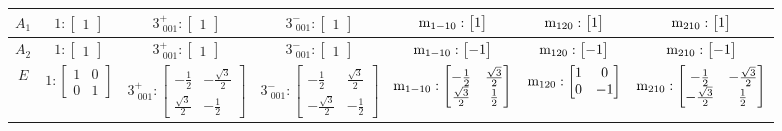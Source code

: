 \documentclass[fleqn,8pt,landscape]{jsarticle}
\begin{document}
\begin{longtable}{ccccccc}
$ A_{1} $ & $ 1:\begin{bmatrix} 1 \end{bmatrix} $ & $ 3^{+}_{\,\,001}:\begin{bmatrix} 1 \end{bmatrix} $ & $ 3^{-}_{\,\,001}:\begin{bmatrix} 1 \end{bmatrix} $ & $ {\rm m}_{1-10}:\begin{bmatrix} 1 \end{bmatrix} $ & $ {\rm m}_{120}:\begin{bmatrix} 1 \end{bmatrix} $ & $ {\rm m}_{210}:\begin{bmatrix} 1 \end{bmatrix} $ \\ \hline
$ A_{2} $ & $ 1:\begin{bmatrix} 1 \end{bmatrix} $ & $ 3^{+}_{\,\,001}:\begin{bmatrix} 1 \end{bmatrix} $ & $ 3^{-}_{\,\,001}:\begin{bmatrix} 1 \end{bmatrix} $ & $ {\rm m}_{1-10}:\begin{bmatrix} -1 \end{bmatrix} $ & $ {\rm m}_{120}:\begin{bmatrix} -1 \end{bmatrix} $ & $ {\rm m}_{210}:\begin{bmatrix} -1 \end{bmatrix} $ \\ \hline
$ E $ & $ 1:\begin{bmatrix} 1 & 0 \\ 0 & 1 \end{bmatrix} $ & $ 3^{+}_{\,\,001}:\begin{bmatrix} - \frac{1}{2} & - \frac{\sqrt{3}}{2} \\ \frac{\sqrt{3}}{2} & - \frac{1}{2} \end{bmatrix} $ & $ 3^{-}_{\,\,001}:\begin{bmatrix} - \frac{1}{2} & \frac{\sqrt{3}}{2} \\ - \frac{\sqrt{3}}{2} & - \frac{1}{2} \end{bmatrix} $ & $ {\rm m}_{1-10}:\begin{bmatrix} - \frac{1}{2} & \frac{\sqrt{3}}{2} \\ \frac{\sqrt{3}}{2} & \frac{1}{2} \end{bmatrix} $ & $ {\rm m}_{120}:\begin{bmatrix} 1 & 0 \\ 0 & -1 \end{bmatrix} $ & $ {\rm m}_{210}:\begin{bmatrix} - \frac{1}{2} & - \frac{\sqrt{3}}{2} \\ - \frac{\sqrt{3}}{2} & \frac{1}{2} \end{bmatrix} $ \\
\end{longtable}
\end{document}
